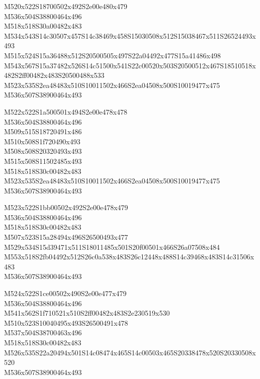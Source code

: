 \documentclass{article}
\begin{document}
\begin{multicols}{5}
\begin{center}
M520x522S18700502x492S2e00e480x479 %
\\M536x504S38800464x496 %
\\M518x518S30a00482x483 %
\\M534x543S14c30507x457S14c38469x458S15030508x512S15038467x511S26524493x493 %
\\M515x524S15a36488x512S20500505x497S22a04492x477S15a41486x498 %
\\M543x567S15a37482x526S14c51500x541S22c00520x503S20500512x467S18510518x482S2ff00482x483S20500488x533 %
\\M523x535S2ea48483x510S10011502x466S2ea04508x500S10019477x475 %
\\M536x507S38900464x493 %
\vfil
\columnbreak

M522x522S1a500501x494S2e00e478x478 %
\\M536x504S38800464x496 %
\\M509x515S18720491x486 %
\\M510x508S1f720490x493 %
\\M508x508S20320493x493 %
\\M515x508S11502485x493 %
\\M518x518S30c00482x483 %
\\M523x535S2ea48483x510S10011502x466S2ea04508x500S10019477x475 %
\\M536x507S38900464x493 %
\vfil
\columnbreak

M523x522S1bb00502x492S2e00e478x479 %
\\M536x504S38800464x496 %
\\M518x518S30c00482x483 %
\\M507x523S15a28494x496S26500493x477 %
\\M529x534S15d39471x511S18011485x501S20f00501x466S26a07508x484 %
\\M553x518S2fb04492x512S26c0a538x483S26c12448x488S14c39468x483S14c31506x483 %
\\M536x507S38900464x493 %
\vfil
\columnbreak

M524x522S1ce00502x490S2e00e477x479 %
\\M536x504S38800464x496 %
\\M541x562S1f710521x510S2ff00482x483S2e230519x530 %
\\M510x523S10040495x493S26500491x478 %
\\M537x504S38700463x496 %
\\M518x518S30c00482x483 %
\\M526x535S22a20494x501S14c08474x465S14c00503x465S20338478x520S20330508x520 %
\\M536x507S38900464x493 %
\vfil
\columnbreak


\end{center}
\end{multicols}
\end{document}
